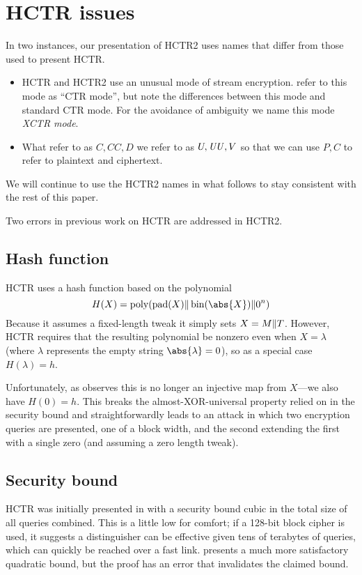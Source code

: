 \documentclass[hctr.tex]{subfiles}
\begin{document}
\section{HCTR issues}
In two instances, our presentation of HCTR2 uses
names that differ from those used to present HCTR.

\begin{itemize}
    \item HCTR and HCTR2 use an unusual mode of stream encryption.
    \cite{hctr,hctrquad} refer to this mode as ``CTR mode'',
    but note the differences between this mode and 
    standard CTR mode\cite{ctr}.
    For the avoidance of ambiguity
    we name this mode \emph{XCTR mode}.
    \item What \cite{hctr,hctrquad} refer to as \(C, \mathit{CC}, D\)
    we refer to as \(U, \mathit{UU}, V\)
    so that we can use \(P, C\) to refer to plaintext and ciphertext.
\end{itemize}

We will continue to use the HCTR2 names in
what follows to stay consistent with the rest of this paper.

Two errors in previous work on HCTR are addressed in HCTR2.

\subsection{Hash function}\label{badhash}
HCTR uses a hash function based on the polynomial
\begin{displaymath}
    H(X) = \poly(\pad(X) \Concat \fromint(\abs{X}) \Concat 0^n)
\end{displaymath}
Because it assumes a fixed-length tweak it simply sets \(X = M \Vert T\).
However, HCTR requires that the resulting polynomial be nonzero
even when \(X = \lambda\)
(where \(\lambda\) represents the empty string \(\abs{\lambda} = 0\)),
so as a special case \(H(\lambda) = h\).

Unfortunately, as \cite{kumarhctr} observes this is no longer
an injective map from \(X\)---we also have \(H(0) = h\). This
breaks the almost-XOR-universal property relied on
in the security bound and
straightforwardly leads to an attack in which two encryption queries
are presented, one of a block width, and the second extending
the first with a single zero (and assuming a zero length tweak).

\subsection{Security bound}\label{badproof}
HCTR was initially presented in \cite{hctr} with a security bound cubic
in the total size of all queries combined.  This is a little low
for comfort; if a 128-bit block cipher is used, it suggests a
distinguisher can be effective given tens of terabytes of queries,
which can quickly be reached over a fast link. 
\cite{hctrquad} presents a much more satisfactory quadratic bound,
but the proof has an error that invalidates the claimed bound.
\end{document}
